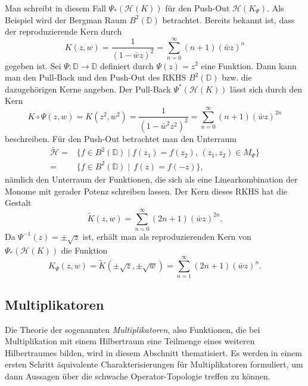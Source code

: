 \documentclass[12pt,titlepage,twoside,cleardoublepage]{article}
\theoremstyle{nummermitklammern}
\numberwithin{equation}{section}
\begin{document}
Man schreibt in diesem Fall $\Psi_*(\mathcal{H}(K))$ für den Push-Out $\mathcal{H}(K_{\Psi}).$ Als Beispiel wird der Bergman Raum $B^2(\mathbb{D})$ betrachtet. Bereits bekannt ist, dass der reproduzierende Kern durch 
\[
K(z,w)=\frac{1}{(1-\bar{w}z)^2}=\sum_{n=0}^{\infty}(n+1)(\bar{w}z)^n
\] gegeben ist. Sei $\Psi:\mathbb{D}\to \mathbb{D}$ definiert durch $\Psi(z)=z^2$ eine Funktion. Dann kann man den Pull-Back und den Push-Out des RKHS $B^2(\mathbb{D})$ bzw. die dazugehörigen Kerne angeben. Der Pull-Back $\Psi^*(\mathcal{H}(K))$ lässt sich durch den Kern 
\[
K\circ \Psi(z,w)=K(z^2,w^2)=\frac{1}{(1-\bar{w}^2z^2)^2}=\sum_{n=0}^{\infty}(n+1)(\bar{w}z)^{2n}
\] beschreiben.
Für den Push-Out betrachtet man den Unterraum
\begin{align*}
\tilde{\mathcal{H}}=&\{f\in B^2(\mathbb{D})\mid  f(z_1)=f(z_2),\, (z_1,z_2)\in M_{\Psi}\}\\
=&\{f\in B^2(\mathbb{D})\mid \, f(z)=f(-z)\}
,
 \end{align*} 
nämlich den Unterraum der Funktionen, die sich als eine Linearkombination der Monome mit gerader Potenz schreiben lassen. Der Kern dieses RKHS hat die Gestalt 
\[
\tilde{K}(z,w)=\sum_{n=0}^{\infty}(2n+1)(\overline{w}z)^{2n}.
\]
 Da $\Psi^{-1}(z)=\pm\sqrt{z}$ ist, erhält man als reproduzierenden Kern von $\Psi_*(\mathcal{H}(K))$ die Funktion
\[
K_{\Psi}(z,w)=\tilde{K}(\pm\sqrt{z},\pm \sqrt{w})=\sum_{n=1}^{\infty}(2n+1)(\overline{w}z)^{n}.
\]

\subsection{Multiplikatoren}
Die Theorie der sogenannten \emph{Multiplikatoren}, also Funktionen, die bei Multiplikation mit einem Hilbertraum eine Teilmenge eines weiteren Hilbertraumes bilden, wird in diesem Abschnitt thematisiert. Es werden in einem ersten Schritt äquivalente Charakterisierungen für Multiplikatoren formuliert, um dann Aussagen über die schwache Operator-Topologie treffen zu können. 
\end{document}
